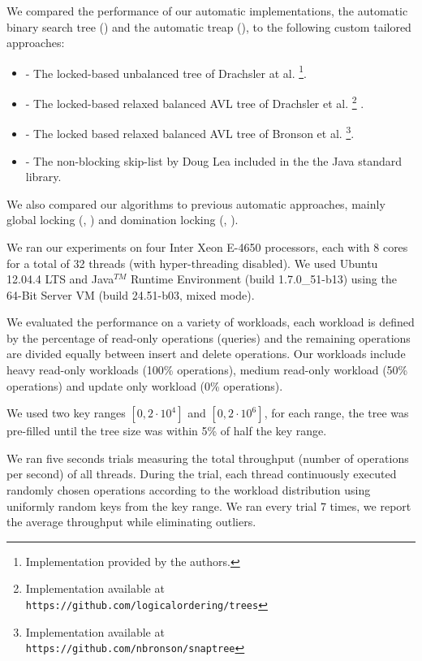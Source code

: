 We compared the performance of our automatic implementations, 
the automatic binary search tree (\autoTree) and the automatic
treap (\autoTreap), to the following custom tailored approaches: 
\begin{itemize}
\item \danaTree - The locked-based 
				unbalanced tree of Drachsler at al.\cite{DrachslerVY2014}
				\footnote{Implementation provided by the authors.}. 
\item \danaAVL - The locked-based relaxed balanced AVL tree of 
				Drachsler et al.\cite{DrachslerVY2014}
				\footnote{Implementation available at \\
				\texttt{https://github.com/logicalordering/trees}} .
\item \bronson - The locked based relaxed balanced AVL tree
				of Bronson et al.\cite{BronsonCCO2010}
				\footnote{Implementation available at \\
				\texttt{https://github.com/nbronson/snaptree}}.
\item \skiplist - The non-blocking skip-list by Doug 
				Lea included in the 
				the Java standard library.
\end{itemize}

We also compared our algorithms to previous automatic approaches, 
mainly global locking (\globalTree, \globalTreap) 
and domination locking (\domTree, \domTreap). 

We ran our experiments on four Inter Xeon E-4650 processors, 
each with 8 cores for a total of 32 threads 
(with hyper-threading disabled). 
We used Ubuntu 12.04.4 LTS and Java$^{TM}$ Runtime Environment (build
1.7.0\_51-b13) using the 64-Bit Server VM (build 24.51-b03, mixed mode).


We evaluated the performance on a variety of workloads, 
each workload is defined by the percentage of read-only
operations (\getOP queries) and the remaining operations 
are divided equally between insert and delete operations.
Our workloads include heavy read-only workloads
(100\% \getOP operations), medium read-only workload 
(50\% \getOP operations) and update only workload
(0\% \getOP operations). 

We used two key ranges $[0,2\cdot10^4]$ and $[0,2\cdot10^6]$,
for each range, the tree was pre-filled until the tree size was 
within 5\% of half the key range.   

We ran five seconds trials measuring the total throughput
(number of operations per second) of all threads.
During the trial, each thread continuously executed randomly
chosen operations according to the workload distribution 
using uniformly random keys from the key range.  
We ran every trial 7 times, we report the average throughput
while eliminating outliers.

